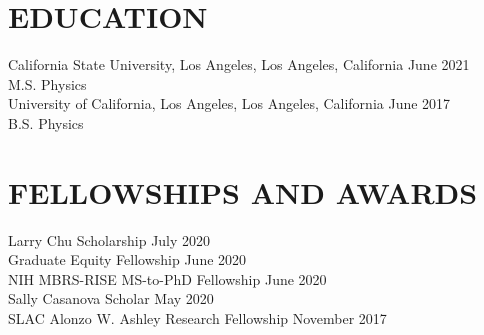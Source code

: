 \documentclass[margin,line]{res}
\let\origsection\section%
\let\section\subsection%
\let\section\origsection%
\begin{document}
\begin{resume}
%

\iffalse
\section{OBJECTIVE}
To pursue a Physics PhD in Quantum Information and Computing.
\fi

\section{\mysidestyle  EDUCATION}
California State University, Los Angeles, Los Angeles, California \hfill June 2021\\
M.S. Physics\\[2.5mm]
%
University of California, Los Angeles, Los Angeles, California \hfill June 2017 \\
B.S. Physics\\[2.5mm]
%

\section{\mysidestyle  FELLOWSHIPS AND AWARDS}  
Larry Chu Scholarship \hfill July 2020 \\
Graduate Equity Fellowship \hfill June 2020 \\
NIH MBRS-RISE MS-to-PhD Fellowship \hfill June 2020 \\
Sally Casanova Scholar \hfill May 2020 \\
SLAC Alonzo W. Ashley Research Fellowship \hfill November 2017 \\


\end{resume}
\end{document}
